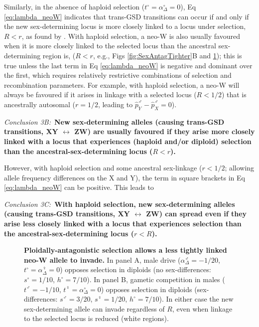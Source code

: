 \documentclass[10pt,letterpaper]{article}
\begin{document}
\noindent
Similarly, in the absence of haploid selection ($t^\circ=\alpha^\circ_{\Delta}=0$), Eq \eqref{eq:lambda_neoW} indicates that trans-GSD transitions can occur if and only if the new sex-determining locus is more closely linked to a locus under selection, $R<r$, as found by \cite{vanDoorn:2010hu}. 
With haploid selection, a neo-W is also usually favoured when it is more closely linked to the selected locus than the ancestral sex-determining region is, ($R<r$, e.g., Figs \ref{fig:SexAntagTighter}B and \ref{fig:Combination_Centimorgans}); this is true unless the last term in Eq \eqref{eq:lambda_neoW} is negative and dominant over the first, which requires relatively restrictive combinations of selection and recombination parameters. 
For example, with haploid selection, a neo-W will always be favoured if it arises in linkage with a selected locus ($R<1/2$) that is ancestrally autosomal ($r=1/2$, leading to $ \hat{p}^\male_Y-\hat{p}^\male_X =0$). 

\vspace{0.5cm}
\noindent\textit{Conclusion 3B:}\
\textbf{New sex-determining alleles (causing trans-GSD transitions, XY $\leftrightarrow$ ZW) are usually favoured if they arise more closely linked with a locus that experiences (haploid and/or diploid) selection than the ancestral-sex-determining locus ($R<r$).
}
\vspace{0.5cm}

\noindent
However, with haploid selection and some ancestral sex-linkage ($r<1/2$; allowing allele frequency differences on the X and Y), the term in square brackets in Eq \eqref{eq:lambda_neoW} can be positive.
This leads to 

\vspace{0.5cm}
\noindent\textit{Conclusion 3C:}\
\textbf{With haploid selection, new sex-determining alleles (causing trans-GSD transitions, XY $\leftrightarrow$ ZW) can spread even if they arise less closely linked with a locus that experiences selection than the ancestral-sex-determining locus ($r<R$).}
\vspace{0.5cm}

\begin{figure}[!h]
\centering
\caption{
{\bf Ploidally-antagonistic selection allows a less tightly linked neo-W allele to invade.}
In panel A, male drive ($\alpha^\male_{\Delta} = -1/20$, $t^\circ = \alpha^\female_{\Delta} = 0$) opposes selection in diploids (no sex-differences: $s^\circ = 1/10$, $h^\circ = 7/10$).   
In panel B, gametic competition in males ($t^\male = -1/10$, $t^\female = \alpha^\circ_{\Delta} = 0$) opposes selection in diploids (sex-differences: $s^\male = 3/20$, $s^\female = 1/20$, $h^\circ = 7/10$).
In either case the new sex-determining allele can invade regardless of $R$, even when linkage to the selected locus is reduced (white regions).
}
\label{fig:Combination_Centimorgans}
\end{figure}
\end{document}
